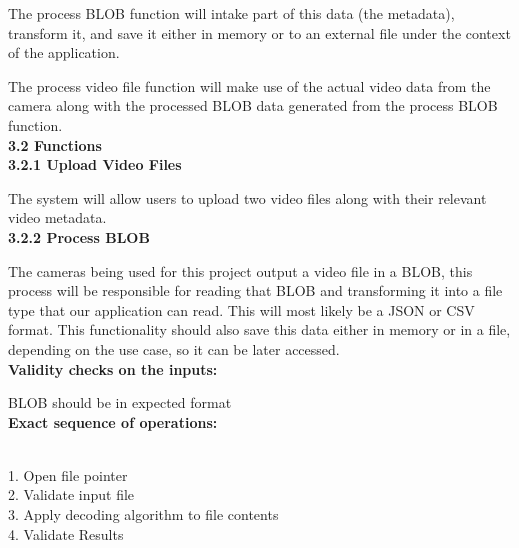 \documentclass[10pt,draftclsnofoot,onecolumn]{IEEEtran}
\begin{document}
The process BLOB function will intake part of this data (the metadata), transform it, and save it either in memory or to an external file under the context of the application.\\
\vspace{2mm}


The process video file function will make use of the actual video data from the camera along with the processed BLOB data generated from the process BLOB function.\\

\vspace{5mm}
{\Medium\textbf{3.2 Functions}} \\
\vspace{5mm}
\textbf{{3.2.1 Upload Video Files}} \\
\vspace{5mm}


 The system will allow users to upload two video files along with their relevant video metadata.\\
 \vspace{5mm}
\textbf{{3.2.2 Process BLOB}} \\
\vspace{5mm}


 The cameras being used for this project output a video file in a BLOB, this process will be responsible for reading that BLOB and transforming it into a file type that our application can read. This will most likely be a JSON or CSV format. This functionality should also save this data either in memory or in a file, depending on the use case, so it can be later accessed.\\
 \vspace{5mm}
 \textbf{Validity checks on the inputs:}\\
  \vspace{5mm}

  BLOB should be in expected format
\\
 \vspace{5mm}
\textbf{Exact sequence of operations: }\\\\
 \vspace{5mm}

1. Open file pointer\\
2. Validate input file\\
3. Apply decoding algorithm to file contents\\
4. Validate Results\\

 \vspace{5mm}
\end{document}
